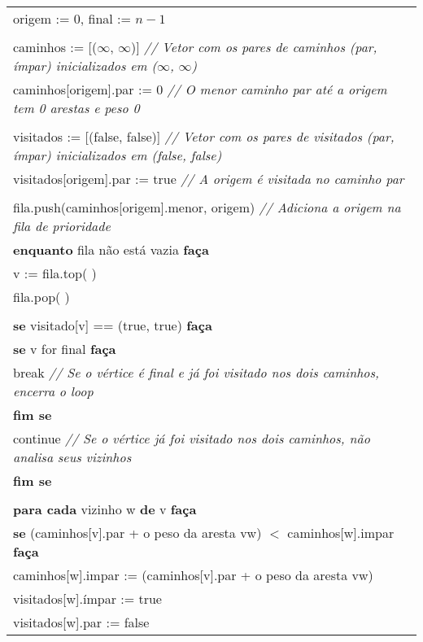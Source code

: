 \documentclass[12pt]{article}
\begin{document}
		\noindent\begin{tabular}{l}
			origem := 0, final := $n-1$ \\ \\
			caminhos := [($\infty$, $\infty$)] \footnotesize \textit{// Vetor com os pares de caminhos (par, ímpar) inicializados em ($\infty$, $\infty$)} \\
			caminhos[origem].par := 0 \footnotesize \textit{// O menor caminho par até a origem tem 0 arestas e peso 0} \\ \\
			visitados := [(false, false)] \footnotesize \textit{// Vetor com os pares de visitados (par, ímpar) inicializados em (false, false)} \\
			visitados[origem].par := true \footnotesize \textit{// A origem é visitada no caminho par} \\ \\
			fila.push(caminhos[origem].menor, origem) \footnotesize \textit{// Adiciona a origem na fila de prioridade } \\
			\textbf{enquanto} fila não está vazia \textbf{faça} \\
			\indent v := fila.top( ) \\
			\indent fila.pop( ) \\ \\
			\indent \textbf{se} visitado[v] == (true, true) \textbf{faça} \\
			\indent \indent \textbf{se} v for final \textbf{faça} \\
			\indent \indent \indent break \footnotesize \textit{// Se o vértice é final e já foi visitado nos dois caminhos, encerra o loop} \\
			\indent \indent \textbf{fim se} \\
			\indent \indent continue \footnotesize \textit{// Se o vértice já foi visitado nos dois caminhos, não analisa seus vizinhos} \\
			\indent \textbf{fim se} \\ \\
			\indent \textbf{para cada} vizinho w \textbf{de} v \textbf{faça} \\
			\indent \indent \textbf{se} (caminhos[v].par + o peso da aresta vw) $<$ caminhos[w].impar \textbf{faça} \\
			\indent \indent \indent caminhos[w].impar := (caminhos[v].par + o peso da aresta vw) \\
			\indent \indent \indent visitados[w].ímpar := true \\
			\indent \indent \indent visitados[w].par := false \\

\end{tabular}
\end{document}
